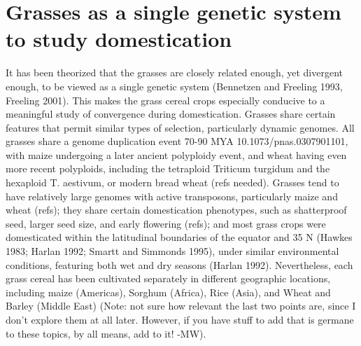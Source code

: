 \documentclass[12pt]{article}
\begin{document}
\section{Grasses as a single genetic system to study domestication}
It has been theorized that the grasses are closely related enough, yet divergent enough, to be viewed as a single genetic system (Bennetzen and Freeling 1993, Freeling 2001).
This makes the grass cereal crops especially conducive to a meaningful study of convergence during domestication.
Grasses share certain features that permit similar types of selection, particularly dynamic genomes.
All grasses share a genome duplication event 70-90 MYA 10.1073/pnas.0307901101, with maize undergoing a later ancient polyploidy event, and wheat having even more recent polyploids, including the tetraploid Triticum turgidum and the hexaploid T. aestivum, or modern bread wheat (refs needed).
Grasses tend to  have relatively large genomes with active transposons, particularly maize and wheat (refs); they share certain domestication phenotypes, such as shatterproof seed, larger seed size, and early flowering (refs); and most grass crops were domesticated within the latitudinal boundaries of the equator and 35 N (Hawkes 1983; Harlan 1992; Smartt and Simmonds 1995), under similar environmental conditions, featuring both wet and dry seasons (Harlan 1992).
Nevertheless, each grass cereal has been cultivated separately in different geographic locations, including maize (Americas), Sorghum (Africa), Rice (Asia), and Wheat and Barley (Middle East) (Note: not sure how relevant the last two points are, since I don't explore them at all later. However, if you have stuff to add that is germane to these topics, by all means, add to it! -MW). \paragraph{}
\end{document}
